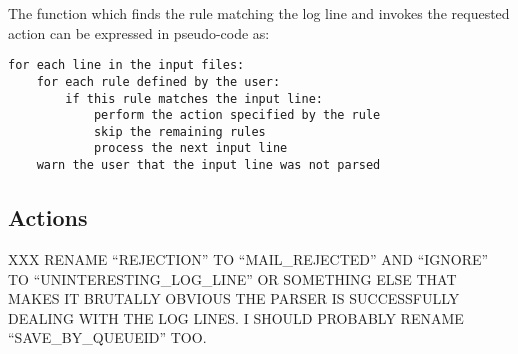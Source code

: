 \documentclass[draft]{svmult}
\begin{document}
The function which finds the rule matching the log line and invokes the
requested action can be expressed in pseudo-code as:


\begin{verbatim}
for each line in the input files: 
    for each rule defined by the user: 
        if this rule matches the input line:
            perform the action specified by the rule
            skip the remaining rules
            process the next input line
    warn the user that the input line was not parsed
\end{verbatim}

\subsection{Actions}

\label{Actions}

XXX RENAME ``REJECTION'' TO ``MAIL\_REJECTED'' AND ``IGNORE'' TO
``UNINTERESTING\_LOG\_LINE'' OR SOMETHING ELSE THAT MAKES IT BRUTALLY
OBVIOUS THE PARSER IS SUCCESSFULLY DEALING WITH THE LOG LINES\@.  I SHOULD
PROBABLY RENAME ``SAVE\_BY\_QUEUEID'' TOO\@.
\end{document}
